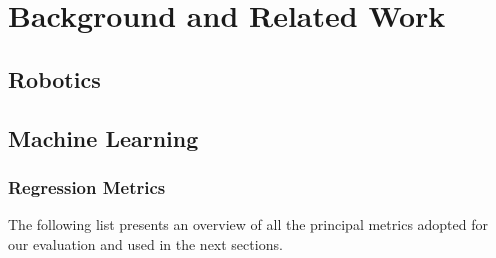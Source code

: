 \chapter{Background and Related Work}
\label{chap:theory}

\glsresetall




\section{Robotics}
\label{sec:robotics}

%




\section{Machine Learning}
\label{sec:machine-learning}


\subsection{Regression Metrics}
\label{subsec:metrics}

The following list presents an overview of all the principal metrics adopted for our evaluation and used in the next sections.

